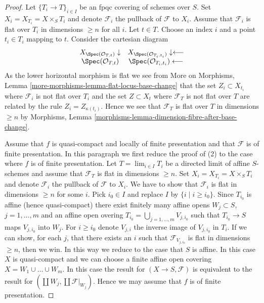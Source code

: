 \begin{proof}
Let $\{T_i \to T\}_{i \in I}$ be an fpqc covering of schemes over $S$.
Set $X_i = X_{T_i} = X \times_S T_i$ and denote $\mathcal{F}_i$ the
pullback of $\mathcal{F}$ to $X_i$. Assume that $\mathcal{F}_i$
is flat over $T_i$ in dimensions $\geq n$ for all $i$. Let $t \in T$.
Choose an index $i$ and a point $t_i \in T_i$ mapping to $t$.
Consider the cartesian diagram
$$
\begin{array}{cc}X_{\Spec(\mathcal{O}_{T, t})} \downarrow & X_{\Spec(\mathcal{O}_{T_i, t_i})} \downarrow\longleftarrow \\ \Spec(\mathcal{O}_{T, t}) & \Spec(\mathcal{O}_{T_i, t_i}) \longleftarrow\end{array}
$$
As the lower horizontal morphism is flat we see from
More on Morphisms, Lemma \ref{more-morphisms-lemma-flat-locus-base-change}
that the set $Z_i \subset X_{t_i}$ where $\mathcal{F}_i$ is not flat
over $T_i$ and the set $Z \subset X_t$ where $\mathcal{F}_T$ is not flat
over $T$ are related by the rule $Z_i = Z_{\kappa(t_i)}$. Hence we see
that $\mathcal{F}_T$ is flat over $T$ in dimensions $\geq n$ by
Morphisms, Lemma \ref{morphisms-lemma-dimension-fibre-after-base-change}.

\medskip\noindent
Assume that $f$ is quasi-compact and locally of finite presentation and
that $\mathcal{F}$ is of finite presentation.
In this paragraph we first reduce the proof of (2) to the case where
$f$ is of finite presentation.
Let $T = \lim_{i \in I} T_i$ be a directed limit of
affine $S$-schemes and assume that $\mathcal{F}_T$ is flat in dimensions
$\geq n$. Set $X_i = X_{T_i} = X \times_S T_i$ and denote $\mathcal{F}_i$
the pullback of $\mathcal{F}$ to $X_i$. We have to show that
$\mathcal{F}_i$ is flat in dimensions $\geq n$ for some $i$.
Pick $i_0 \in I$ and replace $I$ by $\{i \mid i \geq i_0\}$.
Since $T_{i_0}$ is affine (hence quasi-compact) there exist finitely
many affine opens $W_j \subset S$, $j = 1, \ldots, m$ and an affine open
overing $T_{i_0} = \bigcup_{j = 1, \ldots, m} V_{j, i_0}$
such that $T_{i_0} \to S$ maps $V_{j, i_0}$ into $W_j$.
For $i \geq i_0$ denote $V_{j, i}$ the inverse image of $V_{j, i_0}$
in $T_i$. If we can show, for each $j$, that there exists an $i$ such that
$\mathcal{F}_{V_{j, i_0}}$ is flat in dimensions $\geq n$, then
we win. In this way we reduce to the case that $S$ is affine.
In this case $X$ is quasi-compact and we can choose a finite
affine open covering $X = W_1 \cup \ldots \cup W_m$. In this case
the result for $(X \to S, \mathcal{F})$ is equivalent to the result for
$(\coprod W_j, \coprod \mathcal{F}|_{W_j})$. Hence we may assume that
$f$ is of finite presentation.


\end{proof}
